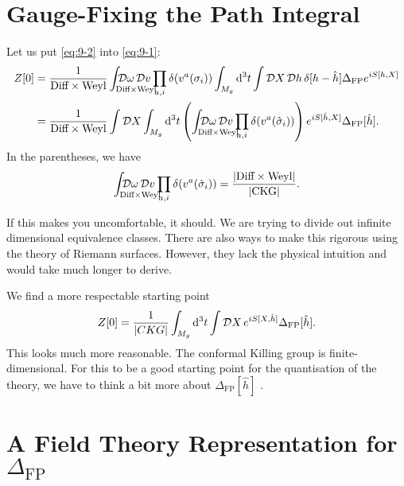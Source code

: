 \section{Gauge-Fixing the Path Integral}%
\label{sec:gauge_fixing_the_path_integral}

Let us put \eqref{eq:9-2} into \eqref{eq:9-1}:
\begin{align}
  Z[0] &= \frac{1}{\text{Diff} \times \text{Weyl}} \int_{\mathrlap{\text{Diff} \times \text{Weyl}}} \pdd{\omega} \pdd{v} \prod_{a, i} \delta(v^a(\sigma_i)) \int_{M_g} \dd[3]{t} \int \pdd{X} \pdd{h} \delta[h - \hat{h}] \Delta_{\text{FP}} e^{i S[h, X]} \\
       &= \frac{1}{\text{Diff} \times \text{Weyl}} \int \pdd{X} \int_{M_g} \dd[3]{t} \left( \int_{\mathrlap{\text{Diff} \times \text{Weyl}}} \pdd{\omega} \pdd{v} \prod_{a, i} \delta(v^a (\hat\sigma_i)) \right) e^{i S[\hat{h}, X]} \Delta_{\text{FP}}[\hat{h}].
\end{align}
In the parentheses, we have
\begin{equation}
  \int_{\mathrlap{\text{Diff} \times \text{Weyl}}}\pdd{\omega} \pdd{v} \prod_{a, i} \delta(v^a (\hat{\sigma}_i)) = \frac{\abs{\text{Diff} \times \text{Weyl}}}{\abs{\text{CKG}}}.
\end{equation}
\begin{leftbar}
  If this makes you uncomfortable, it should. We are trying to divide out infinite dimensional equivalence classes. There are also ways to make this rigorous using the theory of Riemann surfaces. However, they lack the physical intuition and would take much longer to derive.
\end{leftbar}
We find a more respectable starting point
\begin{equation}
  \label{eq:9-3}
  Z[0] = \frac{1}{\abs{CKG}} \int_{M_g} \dd[3]{t} \int \mathop{\mathcal{D} X} e^{i S[X, \hat{h}]} \Delta_{\text{FP}}[\hat{h}].
\end{equation}
This looks much more reasonable. The conformal Killing group is finite-dimensional. 
For this to be a good starting point for the quantisation of the theory, we have to think a bit more about $\Delta_{\text{FP}}[\hat{h}]$ .

\section{A Field Theory Representation for \texorpdfstring{$\Delta_{\text{FP}}$}{the Fadeev--Popov Determinant}}%
\label{sec:a_field_theory_representation_for_FP}

